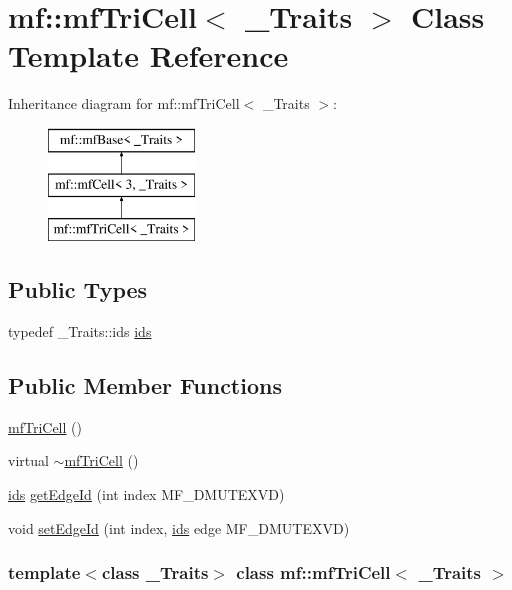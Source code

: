 \hypertarget{classmf_1_1mfTriCell}{
\section{mf::mfTriCell$<$ \_\-Traits $>$ Class Template Reference}
\label{classmf_1_1mfTriCell}
}
Inheritance diagram for mf::mfTriCell$<$ \_\-Traits $>$:\begin{figure}[H]
\begin{center}
\leavevmode
\includegraphics[height=3.000000cm]{classmf_1_1mfTriCell}
\end{center}
\end{figure}
\subsection*{Public Types}
\begin{DoxyCompactItemize}
\item 
typedef \_\-Traits::ids \hyperlink{classmf_1_1mfTriCell_ae8b5f3ec0b85289a7f8b39e1869458e4}{ids}
\end{DoxyCompactItemize}
\subsection*{Public Member Functions}
\begin{DoxyCompactItemize}
\item 
\hyperlink{classmf_1_1mfTriCell_a9a0ee46760e2e224af8d39ce62a0db9e}{mfTriCell} ()
\item 
virtual \hyperlink{classmf_1_1mfTriCell_aa409ed9b738e347231c2920e290c8b47}{$\sim$mfTriCell} ()
\item 
\hyperlink{classmf_1_1mfBase_a3b23f16ddf59da0a91ab12cf57c1f111}{ids} \hyperlink{classmf_1_1mfTriCell_af546fcd05bfbeba9291e91ea91d8706a}{getEdgeId} (int index MF\_\-DMUTEXVD)
\item 
void \hyperlink{classmf_1_1mfTriCell_a7603181ad8135d52001ee1e5f7108621}{setEdgeId} (int index, \hyperlink{classmf_1_1mfBase_a3b23f16ddf59da0a91ab12cf57c1f111}{ids} edge MF\_\-DMUTEXVD)
\end{DoxyCompactItemize}
\subsubsection*{template$<$class \_\-Traits$>$ class mf::mfTriCell$<$ \_\-Traits $>$}



